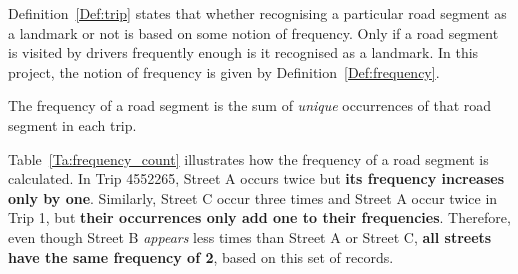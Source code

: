 \begin{table}[h]
\centering
{}
\caption{An illustration of frequency counting}\label{Ta:frequency_count}
\end{table}

Definition~\ref{Def:trip} states that whether recognising a particular road segment as a landmark or not is based on some notion of frequency. Only if a road segment is visited by drivers frequently enough is it recognised as a landmark. In this project, the notion of frequency is given by Definition~\ref{Def:frequency}.

\begin{defn}\label{Def:frequency}
The frequency of a road segment is the sum of \emph{unique} occurrences of that road segment in each trip. 
\end{defn}

Table~\ref{Ta:frequency_count} illustrates how the frequency of a road segment is calculated. In Trip 4552265, Street A occurs twice but \textbf{its frequency increases only by one}. Similarly, Street C occur three times and Street A occur twice in Trip 1, but \textbf{their occurrences only add one to their frequencies}. Therefore, even though Street B \emph{appears} less times than Street A or Street C, \textbf{all streets have the same frequency of 2}, based on this set of records.  

